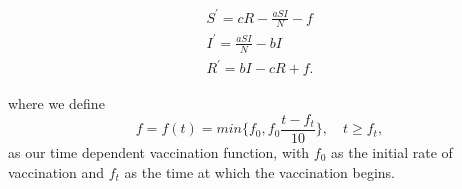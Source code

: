 \documentclass[../main.tex]{subfiles}
\begin{document}
\begin{align}
    \begin{split}
        S^{'}=cR-\frac{aSI}{N}-f \\
        I^{'}=\frac{aSI}{N}-bI \\
        R^{'}=bI-cR+f.
    \end{split}
\end{align}

where we define 
\begin{equation}\label{eq:f}
    f = f(t) = \textit{min} \{ f_0, f_0 \frac{t - f_t}{10}   \}, \quad t \geq f_t, 
\end{equation}
as our time dependent vaccination function, with $f_0$ as the initial rate of vaccination and $f_t$ as the time at which the vaccination begins.
\end{document}

